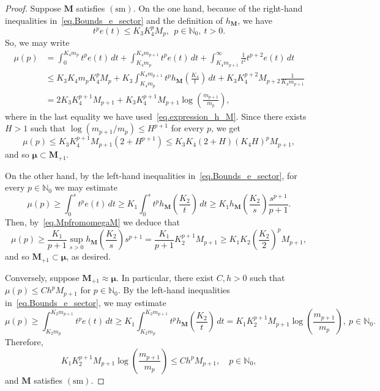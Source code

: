 \documentclass[11pt,a4paper]{article}
\theoremstyle{plain}
\theoremstyle{definition}
\numberwithin{equation}{section}
\newcommand{\N}{\mathbb{N}}
\newcommand{\M}{{\boldsymbol{M}}}
\newcommand{\sm}{\operatorname{(sm)}}
\begin{document}
\begin{proof}
Suppose $\M$ satisfies $\sm$.
On the one hand, because of the right-hand inequalities in~\eqref{eq.Bounds_e_sector} and the definition of $h_{\M}$, we have
\begin{equation*}
t^pe(t)\le K_3K_4^pM_p, \ \ p\in\N_0,\ t>0.
\end{equation*}
So, we may write
	\begin{align*}
		\mu(p)&=\int_0^{K_4m_p} t^p e(t)\,dt+\int_{K_4m_p}^{K_4m_{p+1}} t^p e(t)\,dt
		+\int_{K_4m_{p+1}}^\infty \frac{1}{t^2}t^{p+2}e(t)\,dt\\%
		&\le K_3 K_4 m_p K_4^pM_p+ K_3 \int_{K_4m_p}^{K_4m_{p+1}} t^p h_\M\left(\frac{K_4}{t}\right)\,dt + K_3K_4^{p+2}M_{p+2}\frac{1}{K_4m_{p+1}}\\
		&= 2K_3 K_4^{p+1} M_{p+1}
		+K_3K_4^{p+1}M_{p+1}\log\left(\frac{m_{p+1}}{m_p}\right),
	\end{align*}
where in the last equality we have used~\eqref{eq.expression_h_M}.
Since there exists $H>1$ such that $\log(m_{p+1}/m_p)\leq H^{p+1}$ for every $p$, we get
	\begin{equation*}
		\mu(p)\le K_3 K_4^{p+1} M_{p+1}(2+H^{p+1})
		\leq  K_3K_4(2+H)(K_4H)^{p}M_{p+1},
	\end{equation*}
	and so $\boldsymbol{\mu}\subset \M_{+1}$.

On the other hand, by the left-hand inequalities in~\eqref{eq.Bounds_e_sector}, for every $p\in\N_0$ we may estimate
	$$
	\mu(p)\ge \int_0^s t^p e(t)\,dt \ge K_1 \int_0^s t^p h_{\M}\left(\frac{K_2}{t}\right)\,dt\ge
	K_1 h_{\M}\left(\frac{K_2}{s}\right)\frac{s^{p+1}}{p+1}.
	$$
	Then, by~\eqref{eq.MpfromomegaM} we deduce that
	$$
	\mu(p)\ge \frac{K_1}{p+1} \sup_{s>0}h_{\M}\left(\frac{K_2}{s}\right)s^{p+1}=
	\frac{K_1}{p+1} K_2^{p+1}M_{p+1}\ge
	K_1K_2\left(\frac{K_2}{2}\right)^{p}M_{p+1},
	$$
	and so $\M_{+1}\subset\boldsymbol{\mu}$, as desired.
	
Conversely, suppose $\M_{+1}\approx\boldsymbol{\mu}$. In particular, there exist $C,h>0$ such that $\mu(p)\le Ch^{p}M_{p+1}$ for $ p\in\N_0$. By the left-hand inequalities in~\eqref{eq.Bounds_e_sector}, we may estimate
	$$
	\mu(p)\ge \int_{K_2m_p}^{K_2m_{p+1}} t^p e(t)\,dt \ge K_1 \int_{K_2m_p}^{K_2m_{p+1}} t^p h_{\M}\left(\frac{K_2}{t}\right)\,dt=K_1K_2^{p+1}M_{p+1} \log\left(\frac{m_{p+1}}{m_p}\right),\ p\in\N_0.
	$$
Therefore,	
$$
	K_1K_2^{p+1}M_{p+1}\log\left(\frac{m_{p+1}}{m_p}\right)\leq Ch^{p}M_{p+1},\quad p\in\N_0,
	$$
and $\M$ satisfies $\sm$.
\end{proof}
\end{document}
